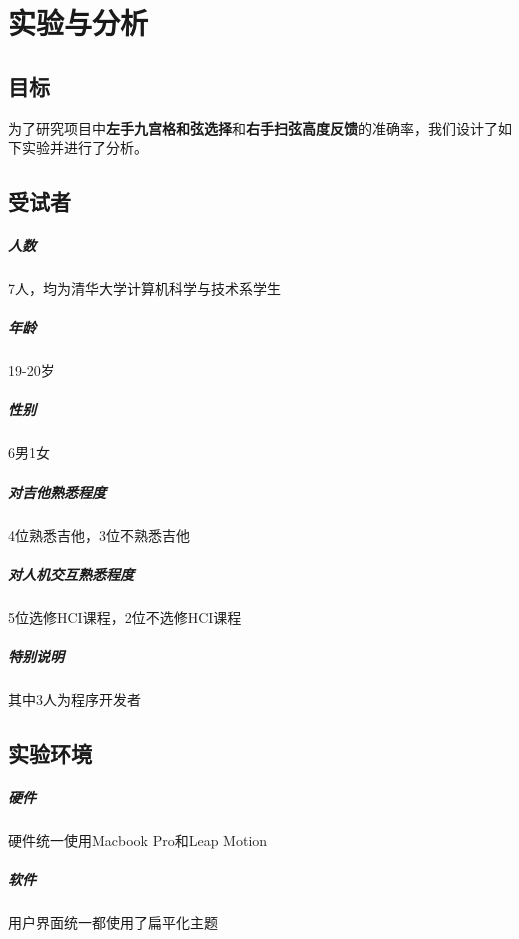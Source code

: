\chapter{实验与分析}

    \section{目标}
    为了研究项目中\textbf{左手九宫格和弦选择}和\textbf{右手扫弦高度反馈}的准确率，我们设计了如下实验并进行了分析。

    \section{受试者}
        \paragraph{人数} 7人，均为清华大学计算机科学与技术系学生
        \paragraph{年龄} 19-20岁
        \paragraph{性别} 6男1女
        \paragraph{对吉他熟悉程度} 4位熟悉吉他，3位不熟悉吉他
        \paragraph{对人机交互熟悉程度} 5位选修HCI课程，2位不选修HCI课程
        \paragraph{特别说明} 其中3人为程序开发者

    \section{实验环境}
        \paragraph{硬件} 硬件统一使用Macbook Pro和Leap Motion
        \paragraph{软件} 用户界面统一都使用了扁平化主题
